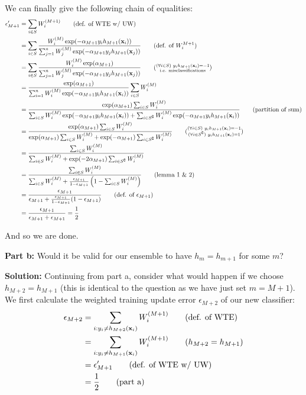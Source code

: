 \documentclass{article}
\renewcommand{\vec}[1]{\mathbf{#1}}
\begin{document}
We can finally give the following chain of equalities:
\allowdisplaybreaks
\begin{align*}
  \epsilon'_{M+1}&=\sum_{i\in S}W^{(M+1)}_i\tag{def. of WTE w/ UW}\\
  &=\sum_{i\in S}\frac{W^{(M)}_i\exp(-\alpha_{M+1}y_ih_{M+1}(\vec x_i))}{\sum_{j=1}^nW_j^{(M)}\exp(-\alpha_{M+1}y_jh_{M+1}(\vec x_j))}\tag{def. of $W_i^{M+1}$}\\
  &=\sum_{i\in S}\frac{W^{(M)}_i\exp(\alpha_{M+1})}{\sum_{j=1}^nW_j^{(M)}\exp(-\alpha_{M+1}y_jh_{M+1}(\vec x_j))}\tag{$\substack{(\forall i\in S)\,\,y_ih_{M+1}(\vec x_i)=-1\\\text{i.e. misclassifications}}$}\\
  &=\frac{\exp(\alpha_{M+1})}{\sum_{i=1}^nW_i^{(M)}\exp(-\alpha_{M+1}y_ih_{M+1}(\vec x_i))}\sum_{i\in S}W_i^{(M)}\\
  &=\frac{\exp(\alpha_{M+1})\sum_{i\in S}W_i^{(M)}}{\sum_{i\in S}W_i^{(M)}\exp(-\alpha_{M+1}y_ih_{M+1}(\vec x_i))+\sum_{i\in S^\complement}W_i^{(M)}\exp(-\alpha_{M+1}y_ih_{M+1}(\vec x_i))}\tag{partition of sum}\\
  &=\frac{\exp(\alpha_{M+1})\sum_{i\in S}W_i^{(M)}}{\exp(\alpha_{M+1})\sum_{i\in S}W_i^{(M)}+\exp(-\alpha_{M+1})\sum_{i\in S^\complement}W_i^{(M)}}\tag{$\substack{(\forall i\in S)\,\,y_ih_{M+1}(\vec x_i)=-1\\(\forall i\in S^\complement)\,\,y_ih_{M+1}(\vec x_i)=1}$}\\
  &=\frac{\sum_{i\in S}W_i^{(M)}}{\sum_{i\in S}W_i^{(M)}+\exp(-2\alpha_{M+1})\sum_{i\in S^\complement}W_i^{(M)}}\\
  &=\frac{\sum_{i\in S}W_i^{(M)}}{\sum_{i\in S}W_i^{(M)}+\frac{\epsilon_{M+1}}{1-\epsilon_{M+1}}\left(1-\sum_{i\in S}W_i^{(M)}\right)}\tag{lemma 1 \& 2}\\
  &=\frac{\epsilon_{M+1}}{\epsilon_{M+1}+\frac{\epsilon_{M+1}}{1-\epsilon_{M+1}}(1-\epsilon_{M+1})}\tag{def. of $\epsilon_{M+1}$}\\
  &=\frac{\epsilon_{M+1}}{\epsilon_{M+1}+\epsilon_{M+1}}=\frac{1}{2}
\end{align*}

And so we are done.
\bigskip

\noindent\textbf{Part b:} Would it be valid for our ensemble to have $h_{m}=h_{m+1}$ for some $m$? 
\bigskip

\noindent\textbf{Solution:} Continuing from part a, consider what would happen if we choose $h_{M+2}=h_{M+1}$ (this is identical to the question as we have just set $m=M+1$). We first calculate the weighted training update error $\epsilon_{M+2}$ of our new classifier:
\begin{align*}
  \epsilon_{M+2}&=\sum_{i:y_i\not=h_{M+2}(\vec x_i)}W_i^{(M+1)}\tag{def. of WTE}\\
  &=\sum_{i:y_i\not=h_{M+1}(\vec x_i)}W_i^{(M+1)}\tag{$h_{M+2}=h_{M+1}$}\\
  &=\epsilon'_{M+1}\tag{def. of WTE w/ UW}\\
  &=\frac{1}{2}\tag{part a}
\end{align*}
\end{document}
